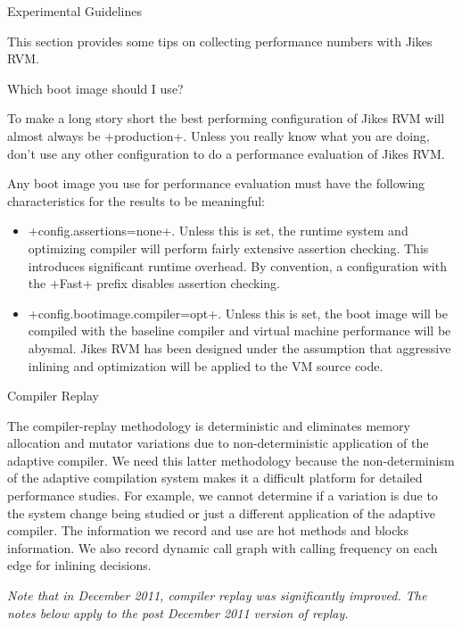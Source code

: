 \begin{section}{Experimental Guidelines}
\label{sec:experimentalguidelines}

This section provides some tips on collecting performance numbers with Jikes RVM. 

\begin{subsection}{Which boot image should I use?}

To make a long story short the best performing configuration of Jikes RVM will almost always be \spverb+production+. Unless you really know what you are doing, don't use any other configuration to do a performance evaluation of Jikes RVM.

Any boot image you use for performance evaluation must have the following characteristics for the results to be meaningful:
\begin{itemize}
    \item \spverb+config.assertions=none+. Unless this is set, the runtime system and optimizing compiler will perform fairly extensive assertion checking. This introduces significant runtime overhead. By convention, a configuration with the \spverb+Fast+ prefix disables assertion checking.
    \item \spverb+config.bootimage.compiler=opt+. Unless this is set, the boot image will be compiled with the baseline compiler and virtual machine performance will be abysmal. Jikes RVM has been designed under the assumption that aggressive inlining and optimization will be applied to the VM source code.
\end{itemize}

\end{subsection}

\begin{subsection}{Compiler Replay}

The compiler-replay methodology is deterministic and eliminates memory allocation and mutator variations due to non-deterministic application of the adaptive compiler. We need this latter methodology because the non-determinism of the adaptive compilation system makes it a difficult platform for detailed performance studies. For example, we cannot determine if a variation is due to the system change being studied or just a different application of the adaptive compiler. The information we record and use are hot methods and blocks information. We also record dynamic call graph with calling frequency on each edge for inlining decisions.

\textit{Note that in December 2011, compiler replay was significantly improved.   The notes below apply to the post December 2011 version of replay.}


\end{subsection}
\end{section}
